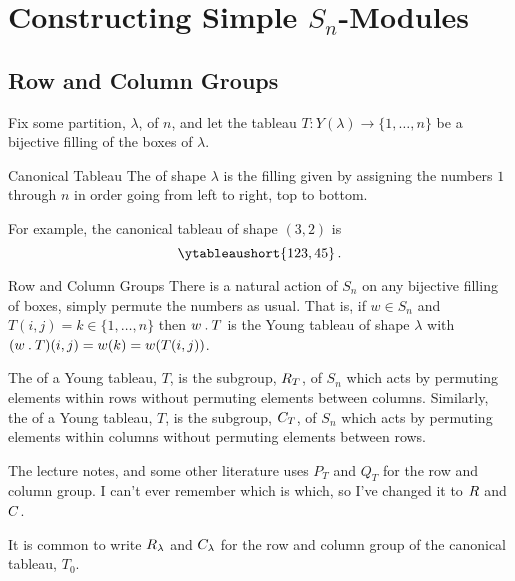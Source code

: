 \section{Constructing Simple \texorpdfstring{\(S_n\)}{Sn}-Modules}
\subsection{Row and Column Groups}
Fix some partition, \(\lambda\), of \(n\), and let the tableau \(T \colon Y(\lambda) \to \{1, \dotsc, n\}\) be a bijective filling of the boxes of \(\lambda\).

\begin{dfn}{Canonical Tableau}{}
    The  of shape \(\lambda\) is the filling given by assigning the numbers \(1\) through \(n\) in order going from left to right, top to bottom.
\end{dfn}

For example, the canonical tableau of shape \((3, 2)\) is
\begin{equation}
    \ytableaushort{123,45}\,.
\end{equation}

\begin{dfn}{Row and Column Groups}{}
    There is a natural action of \(S_n\) on any bijective filling of boxes, simply permute the numbers as usual.
    That is, if \(w \in S_n\) and \(T(i, j) = k \in \{1, \dotsc, n\}\) then \(w \mathbin{.} T\) is the Young tableau of shape \(\lambda\) with \((w \mathbin{.} T)(i, j) = w(k) = w(T(i, j))\).
    
    The  of a Young tableau, \(T\), is the subgroup, \(R_T\), of \(S_n\) which acts by permuting elements within rows without permuting elements between columns.
    Similarly, the  of a Young tableau, \(T\), is the subgroup, \(C_T\), of \(S_n\) which acts by permuting elements within columns without permuting elements between rows.
\end{dfn}

\begin{rmk}
    The lecture notes, and some other literature uses \(P_T\) and \(Q_T\) for the row and column group.
    I can't ever remember which is which, so I've changed it to \(R\) and \(C\).
\end{rmk}

It is common to write \(R_\lambda\) and \(C_\lambda\) for the row and column group of the canonical tableau, \(T_0\).

